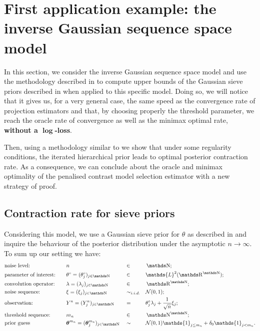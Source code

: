 \section{First application example: the inverse Gaussian sequence space model}\label{2.4}

In this section, we consider the inverse Gaussian sequence space model and use the methodology described in  to compute upper bounds of the Gaussian sieve priors described in  when applied to this specific model.
Doing so, we will notice that it gives us, for a very general case, the same speed as the convergence rate of projection estimators and that, by choosing properly the threshold parameter, we reach the oracle rate of convergence as well as the minimax optimal rate, \textbf{without a $\boldsymbol{\log}$-loss}.

Then, using a methodology similar to  we show that under some regularity conditions, the iterated hierarchical prior leads to optimal posterior contraction rate.
As a consequence, we can conclude about the oracle and minimax optimality of the penalised contrast model selection estimator with a new strategy of proof.

\subsection{Contraction rate for sieve priors}\label{2.4.2}
Considering this model, we use a Gaussian sieve prior for $\theta$ as described in  and inquire the behaviour of the posterior distribution under the asymptotic $n \rightarrow \infty$.
To sum up our setting we have:
\begin{alignat*}{4}
& \text{noise level:} \quad && n && \in && \N; \\
& \text{parameter of interest:} \quad && \theta^{\circ} = (\theta^{\circ}_{j})_{j \in \N} && \in && \mathds{L}^{2}(\R^{\N}); \\
& \text{convolution operator:} \quad && \lambda = (\lambda_{j})_{j \in \N} && \in && \R^{\N}; \\
& \text{noise sequence:} \quad && \xi = (\xi_{j})_{j \in \N} && \sim_{i.i.d.} && \mathcal{N}(0, 1); \\
& \text{observation:} \quad && Y^{n} = (Y_{j}^{n})_{j \in \N} && = && \theta^{\circ}_{j} \lambda_{j} + \frac{1}{\sqrt{n}} \xi_{j}; \\
& \text{threshold sequence:} \quad && m_{n} && \in && \N^{\N}; \\
& \text{prior guess} \quad && \boldsymbol{\theta}^{m_{n}} = (\boldsymbol{\theta}^{m_{n}}_{j})_{j \in \N} && \sim && \mathcal{N}(0, 1) \mathds{1}_{j \leq m_{n}} + \delta_{0} \mathds{1}_{j < m_{n}}. \\
\end{alignat*}

